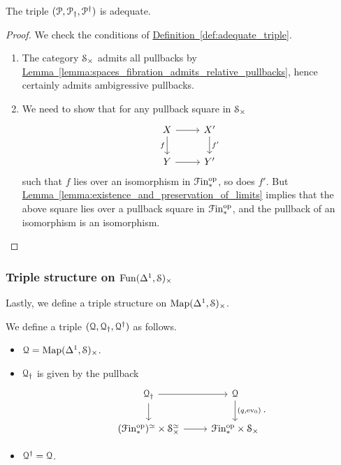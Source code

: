\documentclass[main.tex]{subfiles}
\begin{document}
\begin{proposition}
  The triple $\triple{P}$ is adequate.
\end{proposition}
\begin{proof}
  We check the conditions of \hyperref[def:adequate_triple]{Definition~\ref*{def:adequate_triple}}.
  \begin{enumerate}
    \item The category $\S_{\times}$ admits all pullbacks by \hyperref[lemma:spaces_fibration_admits_relative_pullbacks]{Lemma~\ref*{lemma:spaces_fibration_admits_relative_pullbacks}}, hence certainly admits ambigressive pullbacks.

    \item We need to show that for any pullback square in $\S_{\times}$
      \begin{equation*}
        \begin{tikzcd}
          X
          \arrow[r]
          \arrow[d, swap, "f"]
          & X'
          \arrow[d, "f'"]
          \\
          Y
          \arrow[r]
          & Y'
        \end{tikzcd}
      \end{equation*}
      such that $f$ lies over an isomorphism in $\Finp\op$, so does $f'$. But \hyperref[lemma:existence_and_preservation_of_limits]{Lemma~\ref*{lemma:existence_and_preservation_of_limits}} implies that the above square lies over a pullback square in $\Finp\op$, and the pullback of an isomorphism is an isomorphism.
  \end{enumerate}
\end{proof}

\subsubsection*{Triple structure on \texorpdfstring{$\Fun(\Delta^{1}, \S)_{\times}$}{Fun}}

Lastly, we define a triple structure on $\Map(\Delta^{1}, \S)_{\times}$.
\begin{definition}
  We define a triple $\triple{Q}$ as follows.
  \begin{itemize}
    \item $\mathcal{Q} = \Map(\Delta^{1}, \S)_{\times}$.

    \item $\mathcal{Q}\downdag$ is given by the pullback
      \begin{equation*}
        \begin{tikzcd}
          \mathcal{Q}\downdag
          \arrow[r]
          \arrow[d]
          & \mathcal{Q}
          \arrow[d, "{(q, \ev_{0})}"]
          \\
          (\Finp\op)^{\simeq} \times \S_{\times}^{\simeq}
          \arrow[r]
          & \Finp\op \times \S_{\times}
        \end{tikzcd}.
      \end{equation*}

    \item $\mathcal{Q}\updag = \mathcal{Q}$.
  \end{itemize}
\end{definition}
\end{document}
